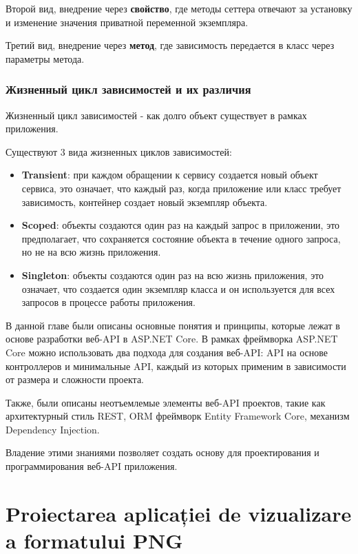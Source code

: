 \documentclass[a4paper,12pt]{report}
\begin{document}
Второй вид, внедрение через \textbf{свойство}, где методы сеттера отвечают за установку и изменение значения приватной переменной экземпляра.

Третий вид, внедрение через \textbf{метод}, где зависимость передается в класс через параметры метода.

\subsection{Жизненный цикл зависимостей и их различия}

Жизненный цикл зависимостей - как долго объект существует в рамках приложения. 

Существуют 3 вида жизненных циклов зависимостей:
\begin{itemize}
    \item
        \textbf{Transient}: при каждом обращении к сервису создается новый объект сервиса, это означает, что каждый раз, 
        когда приложение или класс требует зависимость, контейнер создает новый экземпляр объекта.
    \item
        \textbf{Scoped}: объекты создаются один раз на каждый запрос в приложении, это предполагает, 
        что сохраняется состояние объекта в течение одного запроса, но не на всю жизнь приложения.
    \item
        \textbf{Singleton}:  объекты создаются один раз на всю жизнь приложения, это означает, 
        что создается один экземпляр класса и он используется для всех запросов в процессе работы приложения. 
\end{itemize}


В данной главе были описаны основные понятия и принципы, которые лежат в основе разработки веб-\acs{API} в ASP.NET Core. 
В рамках фреймворка ASP.NET Core можно использовать два подхода для создания веб-\acs{API}: \acs{API} на основе контроллеров и минимальные \acs{API}, 
каждый из которых применим в зависимости от размера и сложности проекта.

Также, были описаны неотъемлемые элементы веб-\acs{API} проектов, такие как архитектурный стиль \acs{REST}, \acs{ORM} фреймворк Entity Framework Core, 
механизм Dependency Injection.

Владение этими знаниями позволяет создать основу для проектирования и программирования веб-\acs{API} приложения.

\chapter{Proiectarea aplicației de vizualizare a formatului \acs{PNG}}\label{architecture_chapter_title}
\end{document}
